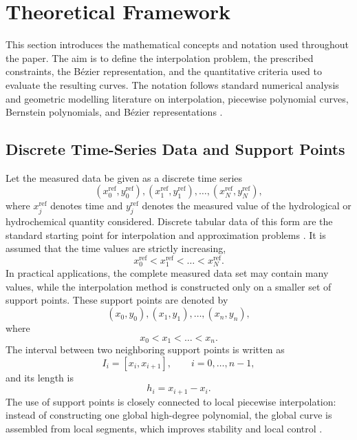 \documentclass[12pt,a4paper]{article}
\begin{document}
\newpage
\section{Theoretical Framework}

This section introduces the mathematical concepts and notation used throughout the paper. The aim is to define the interpolation problem, the prescribed constraints, the B\'ezier representation, and the quantitative criteria used to evaluate the resulting curves. The notation follows standard numerical analysis and geometric modelling literature on interpolation, piecewise polynomial curves, Bernstein polynomials, and B\'ezier representations \cite{krylyk2013computational,deboor1978splines,farin2002curves,piegl1997nurbs}.

\subsection{Discrete Time-Series Data and Support Points}

Let the measured data be given as a discrete time series
\[
(x_0^{\mathrm{ref}},y_0^{\mathrm{ref}}),
(x_1^{\mathrm{ref}},y_1^{\mathrm{ref}}),
\dots,
(x_N^{\mathrm{ref}},y_N^{\mathrm{ref}}),
\]
where \(x_j^{\mathrm{ref}}\) denotes time and \(y_j^{\mathrm{ref}}\) denotes the measured value of the hydrological or hydrochemical quantity considered. Discrete tabular data of this form are the standard starting point for interpolation and approximation problems \cite{krylyk2013computational,deboor1978splines}. It is assumed that the time values are strictly increasing,
\[
x_0^{\mathrm{ref}} < x_1^{\mathrm{ref}} < \dots < x_N^{\mathrm{ref}}.
\]
In practical applications, the complete measured data set may contain many values, while the interpolation method is constructed only on a smaller set of support points. These support points are denoted by
\[
(x_0,y_0),(x_1,y_1),\dots,(x_n,y_n),
\]
where
\[
x_0 < x_1 < \dots < x_n.
\]
The interval between two neighboring support points is written as
\[
I_i=[x_i,x_{i+1}],
\qquad i=0,\dots,n-1,
\]
and its length is
\[
h_i=x_{i+1}-x_i.
\]
The use of support points is closely connected to local piecewise interpolation: instead of constructing one global high-degree polynomial, the global curve is assembled from local segments, which improves stability and local control \cite{deboor1978splines,farin2002curves}.
\end{document}
